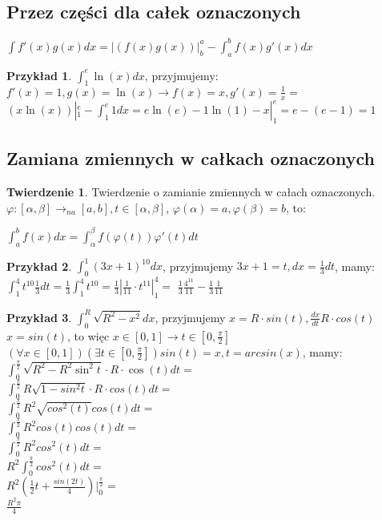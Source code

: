 \documentclass{article}
\theoremstyle{definition}
\theoremstyle{definition}
\newtheorem{tw}{Twierdzenie}[subsection]
\theoremstyle{definition}
\newtheorem{pk}{Przykład}[subsection]
\theoremstyle{definition}
\begin{document}
\subsection{Przez części dla całek oznaczonych}

$\int f'(x)g(x) dx = |(f(x)g(x))|^a_b - \int_a^bf(x)g'(x)dx$

\begin{pk}
    $\int_1^e \ln(x) dx$, przyjmujemy: $f'(x)=1, g(x)=\ln(x) \rightarrow f(x)=x, g'(x)=\frac{1}{x}=$
    $(x \ln(x))|_1^e - \int_1^e 1 dx = e\ln(e) - 1\ln(1) - x|_1^e = e-(e-1)=1$ 
\end{pk}

\subsection{Zamiana zmiennych w całkach oznaczonych}

\begin{tw}
    Twierdzenie o zamianie zmiennych w całach oznaczonych.\\
    $\varphi: [\alpha, \beta] \rightarrow_{na} [a,b], t \in [\alpha, \beta]$,
    $\varphi(\alpha)=a, \varphi(\beta)=b$, to:
    \begin{center}
        $\int_a^b f(x) dx = \int_\alpha^\beta f(\varphi(t))\varphi'(t) dt$
    \end{center}
\end{tw}

\begin{pk}
    $\int_0^1 (3x+1)^{10} dx$, przyjmujemy $3x+1=t, dx=\frac{1}{3}dt$, mamy:
    $\int_1^4 t^{10} \frac{1}{3} dt = \frac{1}{3} \int_1^4 t^{10} = \frac{1}{3} |\frac{1}{11}\cdot t^11|_1^4=$
    $\frac{1}{3}\frac{4^{11}}{11}-\frac{1}{3}\frac{1}{11}$
\end{pk}

\begin{pk}
    $\int_0^R \sqrt{R^2-x^2} dx$, przyjmujemy $x=R\cdot sin(t), \frac{dx}{dt} R\cdot cos(t)$\\
    $x=sin(t)$, to więc $x\in[0,1]\rightarrow t\in[0,\frac{\pi}{2}]$\\
    $\left(\forall x\in[0,1]\right) \left(\exists t\in[0,\frac{\pi}{2}]\right) sin(t)=x, t=arcsin(x)$, mamy:\\
    $\int_0^{\frac{\pi}{2}} \sqrt{R^2-R^2 \sin^2 t}\cdot R\cdot \cos(t) dt=$\\
    $\int_0^{\frac{\pi}{2}} R\sqrt{1-sin^2t}\cdot R\cdot cos(t)dt=$\\
    $\int_0^{\frac{\pi}{2}} R^2 \sqrt{cos^2(t)} cos(t) dt=$\\
    $\int_0^{\frac{\pi}{2}} R^2 cos(t) cos(t) dt=$\\
    $\int_0^{\frac{\pi}{2}} R^2 cos^2(t) dt=$\\
    $R^2 \int_0^{\frac{\pi}{2}} cos^2(t) dt=$\\
    $R^2 (\frac{1}{2}t + \frac{sin(2t)}{4})|_0^{\frac{\pi}{2}}=$\\
    $\frac{R^2\pi}{4}$
\end{pk}
\end{document}
